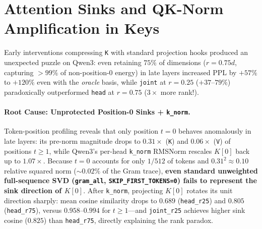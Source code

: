 \documentclass[11pt,a4paper,twocolumn]{article}
\begin{document}
\section{Attention Sinks and QK-Norm Amplification in Keys}
\label{sec:keys}
Early interventions compressing \texttt{K} with standard projection hooks produced an unexpected puzzle on Qwen3: even retaining $75\%$ of dimensions ($r=0.75d$, capturing $>99\%$ of non-position-0 energy) in late layers increased PPL by $+57\%$ to $+120\%$ even with the \emph{oracle} basis, while \texttt{joint} at $r=0.25$ ($+37$--$79\%$) paradoxically outperformed \texttt{head} at $r=0.75$ ($3\times$ more rank!).

\paragraph{Root Cause: Unprotected Position-0 Sinks + \texttt{k\_norm}.}
Token-position profiling reveals that only position $t=0$ behaves anomalously in late layers: its pre-norm magnitude drops to $0.31\times$ (\texttt{K}) and $0.06\times$ (\texttt{V}) of positions $t\ge 1$, while Qwen3's per-head \texttt{k\_norm} RMSNorm rescales $K[0]$ back up to $1.07\times$. Because $t=0$ accounts for only $1/512$ of tokens and $0.31^2\approx 0.10$ relative squared norm ($\sim 0.02\%$ of the Gram trace), \textbf{even standard unweighted full-sequence SVD (\texttt{gram\_all}, \texttt{SKIP\_FIRST\_TOKENS=0}) fails to represent the sink direction of $K[0]$}. After \texttt{k\_norm}, projecting $K[0]$ rotates its unit direction sharply: mean cosine similarity drops to $\mathbf{0.689}$ (\texttt{head\_r25}) and $0.805$ (\texttt{head\_r75}), versus $0.958$--$0.994$ for $t\ge 1$---and \texttt{joint\_r25} achieves higher sink cosine ($0.825$) than \texttt{head\_r75}, directly explaining the rank paradox.
\end{document}
